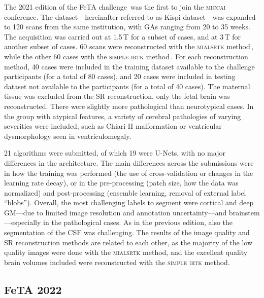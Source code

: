 The 2021 edition of the FeTA challenge\,\cite{FeTA2021_review, FeTA2021} was the first to join the \textsc{miccai} conference. The dataset---hereinafter referred to as Kispi dataset---was expanded to 120 scans from the same institution, with GAs ranging from 20 to 35 weeks. The acquisition was carried out at 1.5\,T for a subset of cases, and at 3\,T for another subset of cases. 60 scans were reconstructed with the \textsc{mialsrtk} method\,\cite{Tourbier2015, MIALSRTK}, while the other 60 cases with the \textsc{simple irtk} method\,\cite{Kuklisova2012, irtk-simple}. For each reconstruction method, 40 cases were included in the training dataset available to the challenge participants (for a total of 80 cases), and 20 cases were included in testing dataset not available to the participants (for a total of 40 cases). The maternal tissue was excluded from the SR reconstruction, only the fetal brain was reconstructed. There were slightly more pathological than neurotypical cases. In the group with atypical features, a variety of cerebral pathologies of varying severities were included, such as Chiari-II malformation or ventricular dysmorphology seen in ventriculomegaly.

21 algorithms were submitted, of which 19 were U-Nets, with no major differences in the architecture. The main differences across the submissions were in how the training was performed (the use of cross-validation or changes in the learning rate decay), or in the pre-processing (patch size, how the data was normalized) and post-processing (ensemble learning, removal of external label \enquote{blobs}). Overall, the most challenging labels to segment were cortical and deep GM---due to limited image resolution and annotation uncertainty---and brainstem---especially in the pathological cases. As in the previous edition, also the segmentation of the CSF was challenging. The results of the image quality and SR reconstruction methods are related to each other, as the majority of the low quality images were done with the \textsc{mialsrtk} method, and the excellent quality brain volumes included were reconstructed with the \textsc{simple irtk} method.

\subsection{FeTA 2022}

